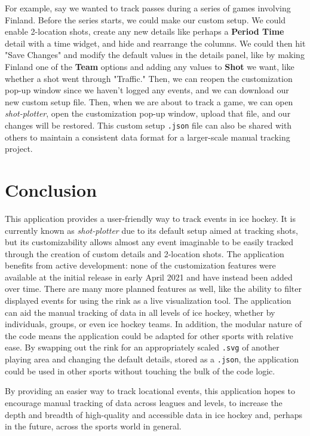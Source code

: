 \documentclass[letterpaper]{article}
\begin{document}
For example, say we wanted to track passes during a series of games involving Finland. Before the series starts, we could make our custom setup. We could enable 2-location shots, create any new details like perhaps a \textbf{Period Time} detail with a time widget, and hide and rearrange the columns. We could then hit "Save Changes" and modify the default values in the details panel, like by making Finland one of the \textbf{Team} options and adding any values to \textbf{Shot} we want, like whether a shot went through "Traffic." Then, we can reopen the customization pop-up window since we haven't logged any events, and we can download our new custom setup file. Then, when we are about to track a game, we can open \textit{shot-plotter}, open the customization pop-up window, upload that file, and our changes will be restored. This custom setup \texttt{.json} file can also be shared with others to maintain a consistent data format for a larger-scale manual tracking project.

\section{Conclusion}
This application provides a user-friendly way to track events in ice hockey. It is currently known as \textit{shot-plotter} due to its default setup aimed at tracking shots, but its customizability allows almost any event imaginable to be easily tracked through the creation of custom details and 2-location shots. The application benefits from active development: none of the customization features were available at the initial release in early April 2021 and have instead been added over time. There are many more planned features as well, like the ability to filter displayed events for using the rink as a live visualization tool. The application can aid the manual tracking of data in all levels of ice hockey, whether by individuals, groups, or even ice hockey teams. In addition, the modular nature of the code means the application could be adapted for other sports with relative ease. By swapping out the rink for an appropriately scaled \texttt{.svg} of another playing area and changing the default details, stored as a \texttt{.json}, the application could be used in other sports without touching the bulk of the code logic. 

By providing an easier way to track locational events, this application hopes to encourage manual tracking of data across leagues and levels, to increase the depth and breadth of high-quality and accessible data in ice hockey and, perhaps in the future, across the sports world in general.


\printbibliography
\end{document}
